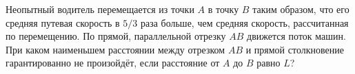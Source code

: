 Неопытный водитель перемещается из точки $A$ в точку $B$ таким образом, что его средняя путевая скорость в $5/3$ раза больше, чем средняя скорость, рассчитанная по перемещению. По прямой, параллельной отрезку $AB$ движется поток машин. При каком наименьшем расстоянии между отрезком $AB$ и прямой столкновение гарантированно не произойдёт, если расстояние от $A$ до $B$ равно $L$?